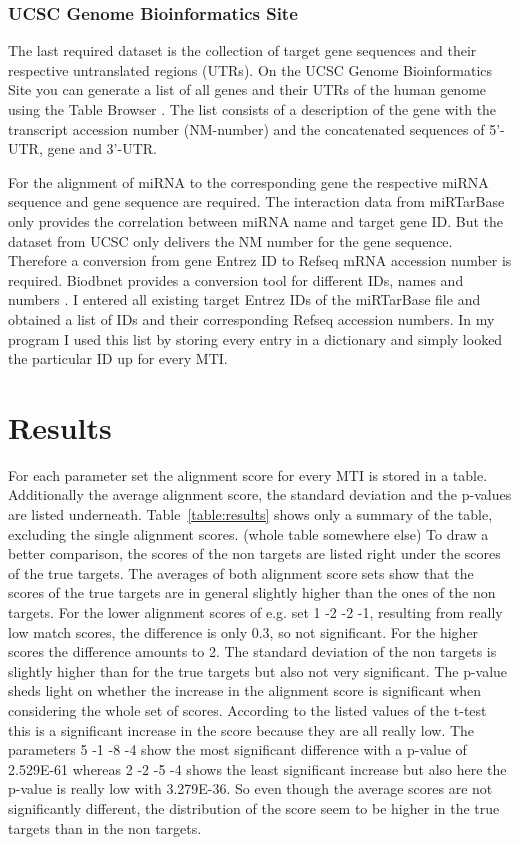 \documentclass[12pt]{article}
\begin{document}
 
\subsubsection{UCSC Genome Bioinformatics Site}
The last required dataset is the collection of target gene sequences and their respective untranslated regions (UTRs). On the UCSC Genome Bioinformatics Site you can generate a list of all genes and their UTRs of the human genome using the Table Browser \cite{ucsc}. The list consists of a description of the gene with the transcript accession number (NM-number) and the concatenated sequences of 5'-UTR, gene and 3'-UTR.

For the alignment of miRNA to the corresponding gene the respective miRNA sequence and gene sequence are required. The interaction data from miRTarBase only provides the correlation between miRNA name and target gene ID. But the dataset from UCSC only delivers the NM number for the gene sequence. Therefore a conversion from gene Entrez ID to Refseq mRNA accession number is required. Biodbnet provides a conversion tool for different IDs, names and numbers \cite{biodb}. I entered all existing target Entrez IDs of the miRTarBase file and obtained a list of IDs and their corresponding Refseq accession numbers. In my program I used this list by storing every entry in a dictionary and simply looked the particular ID up for every MTI. 
 


\section{Results}
For each parameter set the alignment score for every MTI is stored in a table. Additionally the average alignment score, the standard deviation and the p-values are listed underneath. Table~\ref{table:results} shows only a summary of the table, excluding the single alignment scores. (whole table somewhere else) To draw a better comparison, the scores of the non targets are listed right under the scores of the true targets. The averages of both alignment score sets show that the scores of the true targets are in general slightly higher than the ones of the non targets. For the lower alignment scores of e.g. set 1 -2 -2 -1, resulting from really low match scores, the difference is only 0.3, so not significant. For the higher scores the difference amounts to 2. The standard deviation of the non targets is slightly higher than for the true targets but also not very significant. The p-value sheds light on whether the increase in the alignment score is significant when considering the whole set of scores. According to the listed values of the t-test this is a significant increase in the score because they are all really low. The parameters 5 -1 -8 -4 show the most significant difference with a p-value of 2.529E-61 whereas 2 -2 -5 -4 shows the least significant increase but also here the p-value is really low with 3.279E-36. So even though the average scores are not significantly different, the distribution of the score seem to be higher in the true targets than in the non targets.
\end{document}
